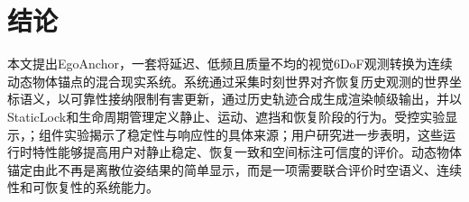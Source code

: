 \documentclass[review]{vgtc}
\newcommand{\system}{EgoAnchor}
\begin{document}
\section{结论}
本文提出\system，一套将延迟、低频且质量不均的视觉6DoF观测转换为连续动态物体锚点的混合现实系统。系统通过采集时刻世界对齐恢复历史观测的世界坐标语义，以可靠性接纳限制有害更新，通过历史轨迹合成生成渲染帧级输出，并以StaticLock和生命周期管理定义静止、运动、遮挡和恢复阶段的行为。受控实验显示，；组件实验揭示了稳定性与响应性的具体来源；用户研究进一步表明，这些运行时特性能够提高用户对静止稳定、恢复一致和空间标注可信度的评价。动态物体锚定由此不再是离散位姿结果的简单显示，而是一项需要联合评价时空语义、连续性和可恢复性的系统能力。



\end{document}
